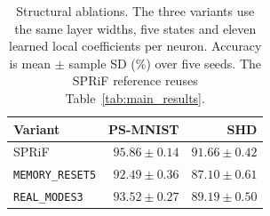 \documentclass[letterpaper,journal]{IEEEtran}
\newcommand{\mr}{\textnormal{\texttt{MEMORY\_RESET5}}}
\newcommand{\rmodes}{\textnormal{\texttt{REAL\_MODES3}}}
\begin{document}
\begin{table}[t]
\caption{Structural ablations. The three variants use the same layer widths, five states and eleven learned local coefficients per neuron. Accuracy is mean $\pm$ sample SD (\%) over five seeds. The SPRiF reference reuses Table~\ref{tab:main_results}.}
\label{tab:ablation}
\centering\footnotesize
\begin{tabular}{@{}lrr@{}}
\toprule
Variant & PS-MNIST & SHD\\
\midrule
SPRiF & $95.86\pm0.14$ & $91.66\pm0.42$\\
\mr & $92.49\pm0.36$ & $87.10\pm0.61$\\
\rmodes & $93.52\pm0.27$ & $89.19\pm0.50$\\
\bottomrule
\end{tabular}
\end{table}
\end{document}
